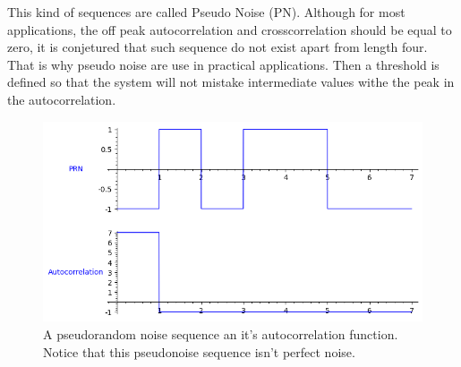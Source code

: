 This kind of sequences are called Pseudo Noise (PN). Although for most applications, the off peak autocorrelation and crosscorrelation should be equal to zero, it is conjetured that such sequence do not exist apart from length four. That is why pseudo noise are use in practical applications. Then a threshold is defined so that the system will not mistake intermediate values withe the peak in the autocorrelation.


\begin{figure}[ht!] %
\begin{center}
\includegraphics[width=0.7\linewidth]{Chapters/Introduction/signals_prn}
\end{center}
\caption{A pseudorandom noise sequence an it's autocorrelation function.
Notice that this pseudonoise sequence isn't perfect noise.}
\label{introduction_signals_autocorrelation}
\end{figure}


